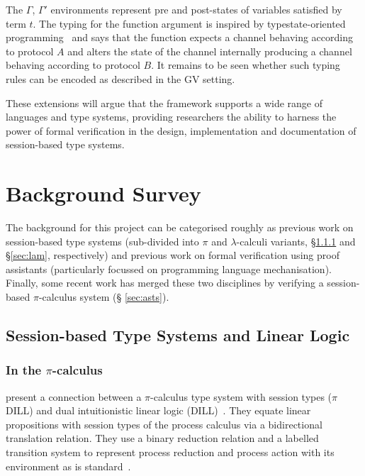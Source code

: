 \documentclass{mprop}
\begin{document}
The $\Gamma$, $\Gamma '$ environments represent pre and post-states of
variables satisfied by term $t$. The typing for the function argument is
inspired by typestate-oriented programming~\cite{Aldrich:2009} and says that
the function expects a channel behaving according to protocol $A$ and alters
the state of the channel internally producing a channel behaving according to
protocol $B$. It remains to be seen whether such typing rules can be encoded
as described in the GV setting.

These extensions will argue that the framework supports a wide range of
languages and type systems, providing researchers the ability to harness the
power of formal verification in the design, implementation and documentation
of session-based type systems.

\section{Background Survey}


The background for this project can be categorised roughly as previous work on
session-based type systems (sub-divided into $\pi$ and $\lambda$-calculi
variants, \S \ref{sec:pis} and \S \ref{sec:lam}, respectively) and previous
work on formal verification using proof assistants (particularly focussed on
programming language mechanisation). Finally, some recent work has merged
these two disciplines by verifying a session-based $\pi$-calculus system (\S
\ref{sec:asts}).

\subsection{Session-based Type Systems and Linear Logic}\label{sec:sts}

\subsubsection{In the \texorpdfstring{$\pi$}{pi}-calculus}\label{sec:pis}

\citeauthor{Caires:2010:STI} \cite{Caires:2010:STI} present a connection
between a $\pi$-calculus type system with session types ($\pi$DILL) and dual
intuitionistic linear logic (DILL)~\cite{Barber:1996}. They equate linear
propositions with session types of the process calculus via a bidirectional
translation relation. They use a binary reduction relation and a labelled
transition system to represent process reduction and process action with its
environment as is standard~\cite{Sangiorgi:2001}.
\end{document}
